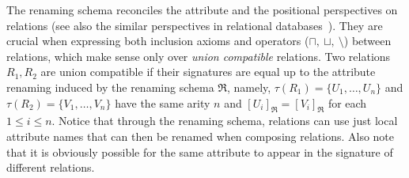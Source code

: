 \documentclass[envcountsame,draft]{llncs}
\newcommand{\greif}[1]{\ensuremath{\bigocirc#1}}
\newcommand{\lreif}[1]{\ensuremath{\bigodot#1}}
\begin{document}

The renaming schema reconciles the attribute and the positional perspectives on relations (see also the similar 
perspectives in relational databases~\cite{AbiteboulHV95}). They are crucial when expressing both inclusion axioms and 
operators ($\sqcap,~\sqcup,~\setminus$) between relations, which make sense only over \emph{union compatible} 
relations. Two relations $R_1,R_2$ are union compatible if their signatures are equal up to the attribute renaming 
induced by the renaming schema $\Re$, namely, $\tau(R_1)=\{U_1,\ldots,U_n\}$ and $\tau(R_2)=\{V_1,\ldots,V_n\}$ 
have the same arity $n$ and $[U_i]_\Re=[V_i]_\Re$ for each $1\leq i\leq n$. Notice that through the renaming schema, 
relations can use just local attribute names that can then be renamed when composing relations.
Also note that it is obviously possible for the same attribute to appear in the signature of different relations.
\end{document}
